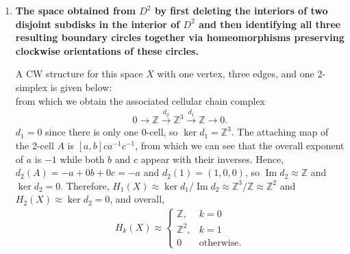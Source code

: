 \documentclass[a4paper,12pt]{article}
\DeclareMathOperator{\im}{Im}
\begin{document}
\begin{enumerate}
\begin{enumerate}[label=(\alph*)]
            \item
                \boldmath\textbf{The space obtained from $D^2$ by first deleting the interiors of two disjoint subdisks in the interior of $D^2$ and then identifying all three resulting boundary circles together via homeomorphisms preserving clockwise orientations of these circles.
                }\unboldmath \par
                A CW structure for this space $X$ with one vertex, three edges, and one 2-simplex is given below:
                \vspace{4cm} \\
                from which we obtain the associated cellular chain complex
                \begin{align*}
                    0 \rightarrow \mathbb{Z} \xrightarrow{d_2} \mathbb{Z}^3 \xrightarrow{d_1} \mathbb{Z} \rightarrow 0.
                \end{align*}
                $d_1 = 0$ since there is only one $0$-cell, so $\ker d_1 = \mathbb{Z}^3$. The attaching map of the 2-cell $A$ is $[a, b]ca^{-1}c^{-1}$, from which we can see that the overall exponent of $a$ is $-1$ while both $b$ and $c$ appear with their inverses. Hence, $d_2(A) = -a + 0b + 0c = -a$ and $d_2(1) = (1, 0, 0)$, so $\im d_2 \approx \mathbb{Z}$ and $\ker d_2 = 0$. Therefore, $H_1(X) \approx \ker d_1 / \im d_2 \approx \mathbb{Z}^3 / \mathbb{Z} \approx \mathbb{Z}^2$ and $H_2(X) \approx \ker d_2 = 0$, and overall,
                \begin{align*}
                    H_k(X) \approx \begin{cases}
                        \mathbb{Z}, &k = 0 \\
                        \mathbb{Z}^2, &k = 1 \\
                        0 &\text{otherwise}.
                    \end{cases}
                \end{align*}


\end{enumerate}
\end{enumerate}
\end{document}
